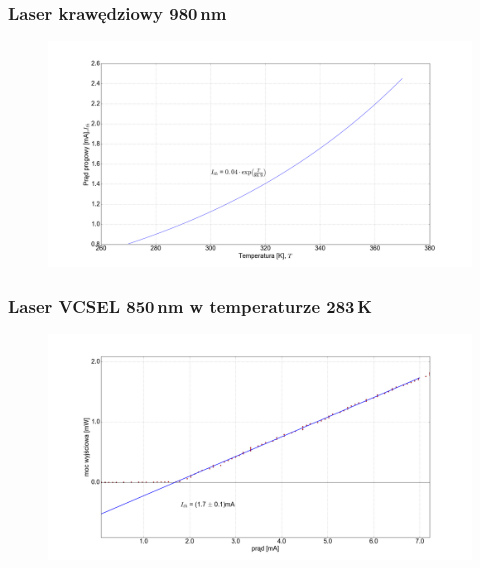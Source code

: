 \documentclass[xcolor={dvipsnames,table}]{beamer}
\begin{document}
\begin{frame}
\frametitle{Laser krawędziowy 980\,nm}
\center
\begin{figure}
   \includegraphics[width=1.10\textwidth,natwidth=69,natheight=87]{plot_i_th.png}
\end{figure}
\end{frame}

\begin{frame}
\frametitle{Laser VCSEL 850\,nm w temperaturze 283\,K}
\center
\begin{figure}
   \includegraphics[width=1.10\textwidth,natwidth=69,natheight=87]{vcsel850/temp_10_fit.png}
\end{figure}
\end{frame}
\end{document}

